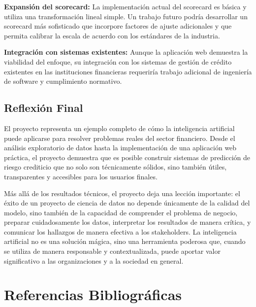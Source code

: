 \documentclass[12pt,a4paper]{article}
\begin{document}
\textbf{Expansión del scorecard:} La implementación actual del scorecard es básica y utiliza una transformación lineal simple. Un trabajo futuro podría desarrollar un scorecard más sofisticado que incorpore factores de ajuste adicionales y que permita calibrar la escala de acuerdo con los estándares de la industria.

\textbf{Integración con sistemas existentes:} Aunque la aplicación web demuestra la viabilidad del enfoque, su integración con los sistemas de gestión de crédito existentes en las instituciones financieras requeriría trabajo adicional de ingeniería de software y cumplimiento normativo.

\subsection{Reflexión Final}

El proyecto representa un ejemplo completo de cómo la inteligencia artificial puede aplicarse para resolver problemas reales del sector financiero. Desde el análisis exploratorio de datos hasta la implementación de una aplicación web práctica, el proyecto demuestra que es posible construir sistemas de predicción de riesgo crediticio que no solo son técnicamente sólidos, sino también útiles, transparentes y accesibles para los usuarios finales.

Más allá de los resultados técnicos, el proyecto deja una lección importante: el éxito de un proyecto de ciencia de datos no depende únicamente de la calidad del modelo, sino también de la capacidad de comprender el problema de negocio, preparar cuidadosamente los datos, interpretar los resultados de manera crítica, y comunicar los hallazgos de manera efectiva a los stakeholders. La inteligencia artificial no es una solución mágica, sino una herramienta poderosa que, cuando se utiliza de manera responsable y contextualizada, puede aportar valor significativo a las organizaciones y a la sociedad en general.

\section{Referencias Bibliográficas}
\end{document}
